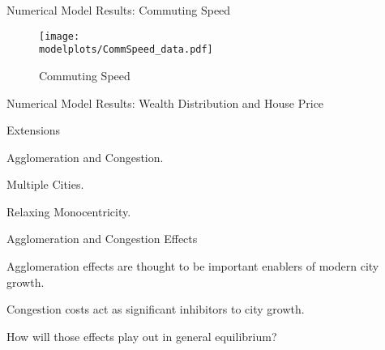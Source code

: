 \documentclass[aspectratio=169]{beamer}
\begin{document}
\begin{frame}{Numerical Model Results: Commuting Speed}

	\begin{figure}[t]
		\centering
		
				\texttt{[image: \\modelplots/CommSpeed\_data.pdf]}
				\caption{Commuting Speed}
			
	\end{figure}
\end{frame}

\begin{frame}{Numerical Model Results: Wealth Distribution and House Price}

	\begin{figure}[t]
		\centering
	\end{figure}
\end{frame}

\begin{frame}{Extensions}

	\begin{mide}
		\item Agglomeration and Congestion.
		\item Multiple Cities.
		\item Relaxing Monocentricity.
	\end{mide}
\end{frame}

\begin{frame}{Agglomeration and Congestion Effects}
	
	\begin{midi}
		\item Agglomeration effects are thought to be important enablers of modern city growth.
		\item Congestion costs act as significant inhibitors to city growth.
		\item How will those effects play out in general equilibrium?
	\end{midi}
\end{frame}
\end{document}

